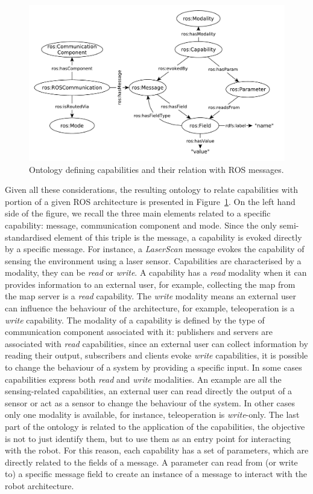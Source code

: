 \begin{figure}[t]
\centering
\includegraphics[width=\textwidth]{gfx/onto/comptocapa1}
\caption{Ontology defining capabilities and their relation with ROS messages.}
\label{fig:onto-capa}
\end{figure}

Given all these considerations, the resulting ontology to relate capabilities with portion of a given ROS architecture is presented in Figure~\ref{fig:onto-capa}. On the left hand side of the figure, we recall the three main elements related to a specific capability: message, communication component and mode. Since the only semi-standardised element of this triple is the message, a capability is evoked directly by a specific message. For instance, a \textit{LaserScan} message evokes the capability of sensing the environment using a laser sensor. Capabilities are characterised by a modality, they can be \textit{read} or \textit{write}. A capability has a \textit{read} modality when it can provides information to an external user, for example, collecting the map from the map server is a \textit{read} capability. The \textit{write} modality means an external user can influence the behaviour of the architecture, for example, teleoperation is a \textit{write} capability. The modality of a capability is defined by the type of communication component associated with it: publishers and servers are associated with \textit{read} capabilities, since an external user can collect information by reading their output, subscribers and clients evoke \textit{write} capabilities, it is possible to change the behaviour of a system by providing a specific input. In some cases capabilities express both \textit{read} and \textit{write} modalities. An example are all the sensing-related capabilities, an external user can read directly the output of a sensor or act as a sensor to change the behaviour of the system. In other cases only one modality is available, for instance, teleoperation is \textit{write}-only. The last part of the ontology is related to the application of the capabilities, the objective is not to just identify them, but to use them as an entry point for interacting with the robot. For this reason, each capability has a set of parameters, which are directly related to the fields of a message. A parameter can read from (or write to) a specific message field to create an instance of a message to interact with the robot architecture.

